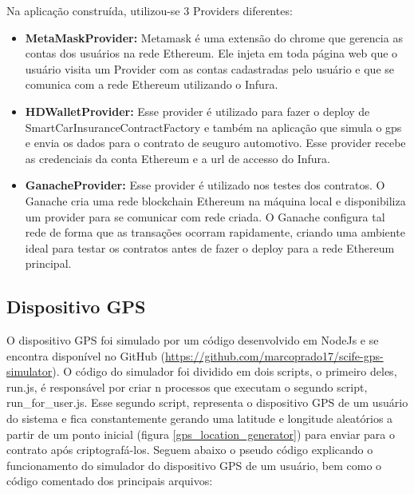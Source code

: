 Na aplicação construída, utilizou-se 3 Providers diferentes:

\begin{itemize}
\item \textbf{MetaMaskProvider:} Metamask é uma extensão do chrome que gerencia as contas dos usuários na rede Ethereum. Ele injeta em toda página web que o usuário visita um Provider com as contas cadastradas pelo usuário e que se comunica com a rede Ethereum utilizando o Infura.
\item \textbf{HDWalletProvider:} Esse provider é utilizado para fazer o deploy de SmartCarInsuranceContractFactory e também na aplicação que simula o gps e envia os dados para o contrato de seuguro automotivo. Esse provider recebe as credenciais da conta Ethereum e a url de accesso do Infura.
\item \textbf{GanacheProvider:} Esse provider é utilizado nos testes dos contratos. O Ganache cria uma rede blockchain Ethereum na máquina local e disponibiliza um provider para se comunicar com rede criada. O Ganache configura tal rede de forma que as transações ocorram rapidamente, criando uma ambiente ideal para testar os contratos antes de fazer o deploy para a rede Ethereum principal.
\end{itemize}

\subsection{Dispositivo GPS}

O dispositivo GPS foi simulado por um código desenvolvido em NodeJs e se encontra disponível no GitHub (\href{https://github.com/marcoprado17/scife-gps-simulator}{https://github.com/marcoprado17/scife-gps-simulator}). O código do simulador foi dividido em dois scripts, o primeiro deles, run.js, é responsável por criar n processos que executam o segundo script, run\_for\_user.js. Esse segundo script, representa o dispositivo GPS de um usuário do sistema e fica constantemente gerando uma latitude e longitude aleatórios a partir de um ponto inicial (figura \ref{gps_location_generator}) para enviar para o contrato após criptografá-los. Seguem abaixo o pseudo código explicando o funcionamento do simulador do dispositivo GPS de um usuário, bem como o código comentado dos principais arquivos:


